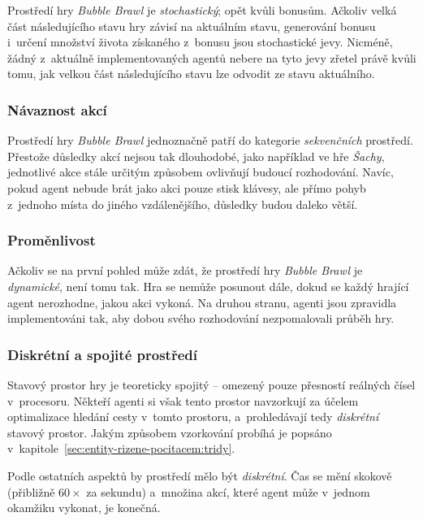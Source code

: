 Prostředí hry \emph{Bubble Brawl} je \emph{stochastický}; opět kvůli bonusům. Ačkoliv velká část následujícího stavu hry závisí na aktuálním stavu, generování bonusu i~určení množství života získaného z~bonusu jsou stochastické jevy. Nicméně, žádný z~aktuálně implementovaných agentů nebere na tyto jevy zřetel právě kvůli tomu, jak velkou část následujícího stavu lze odvodit ze stavu aktuálního.

\subsubsection*{Návaznost akcí}

Prostředí hry \emph{Bubble Brawl} jednoznačně patří do kategorie \emph{sekvenčních} prostředí. Přestože důsledky akcí nejsou tak dlouhodobé, jako například ve hře \emph{Šachy}, jednotlivé akce stále určitým způsobem ovlivňují budoucí rozhodování. Navíc, pokud agent nebude brát jako akci pouze stisk klávesy, ale přímo pohyb z~jednoho místa do jiného vzdálenějšího, důsledky budou daleko větší.

\subsubsection*{Proměnlivost}

Ačkoliv se na první pohled může zdát, že prostředí hry \emph{Bubble Brawl} je \emph{dynamické}, není tomu tak. Hra se nemůže posunout dále, dokud se každý hrající agent nerozhodne, jakou akci vykoná. Na druhou stranu, agenti jsou zpravidla implementováni tak, aby dobou svého rozhodování nezpomalovali průběh hry.

\subsubsection*{Diskrétní a spojité prostředí}

Stavový prostor hry je teoreticky spojitý -- omezený pouze přesností reálných čísel v~procesoru. Někteří agenti si však tento prostor navzorkují \cite{MIT_OpenCourseWare:Incremental_Path_Planning} za účelem optimalizace hledání cesty v~tomto prostoru, a~prohledávají tedy \emph{diskrétní} stavový prostor. Jakým způsobem vzorkování probíhá je popsáno v~kapitole~\ref{sec:entity-rizene-pocitacem:tridy}.

Podle ostatních aspektů by prostředí mělo být \emph{diskrétní}. Čas se mění skokově (přibližně $60\times$ za sekundu) a~množina akcí, které agent může v~jednom okamžiku vykonat, je konečná.

